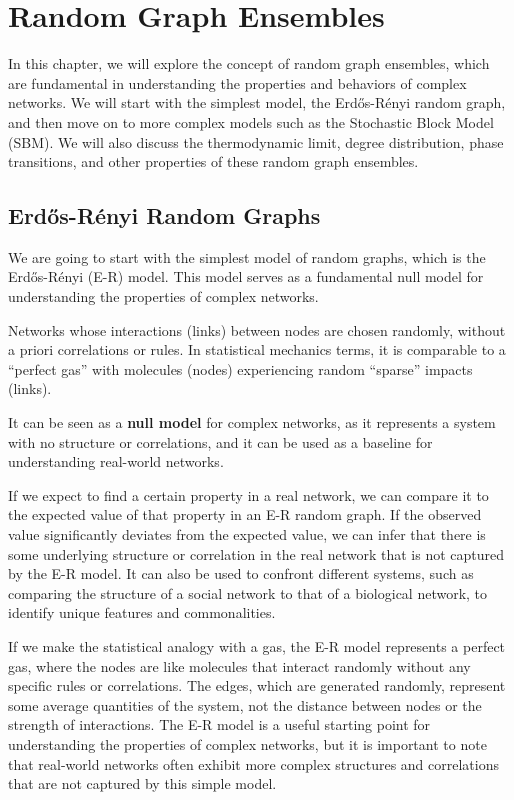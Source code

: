 \chapter{Random Graph Ensembles}

In this chapter, we will explore the concept of random graph ensembles, which are fundamental in understanding the properties and behaviors of complex networks. We will start with the simplest model, the Erdős-Rényi random graph, and then move on to more complex models such as the Stochastic Block Model (SBM). We will also discuss the thermodynamic limit, degree distribution, phase transitions, and other properties of these random graph ensembles.

\section{Erdős-Rényi Random Graphs}

We are going to start with the simplest model of random graphs, which is the Erdős-Rényi (E-R) model. This model serves as a fundamental null model for understanding the properties of complex networks.

\begin{definition}
    Networks whose interactions (links) between nodes are chosen randomly, without a priori correlations or rules. In statistical mechanics terms, it is comparable to a ``perfect gas'' with molecules (nodes) experiencing random ``sparse'' impacts (links).
\end{definition}
It can be seen as a \textbf{null model} for complex networks, as it represents a system with no structure or correlations, and it can be used as a baseline for understanding real-world networks.

If we expect to find a certain property in a real network, we can compare it to the expected value of that property in an E-R random graph. If the observed value significantly deviates from the expected value, we can infer that there is some underlying structure or correlation in the real network that is not captured by the E-R model. It can also be used to confront different systems, such as comparing the structure of a social network to that of a biological network, to identify unique features and commonalities.

If we make the statistical analogy with a gas, the E-R model represents a perfect gas, where the nodes are like molecules that interact randomly without any specific rules or correlations. The edges, which are generated randomly, represent some average quantities of the system, not the distance between nodes or the strength of interactions. The E-R model is a useful starting point for understanding the properties of complex networks, but it is important to note that real-world networks often exhibit more complex structures and correlations that are not captured by this simple model.

